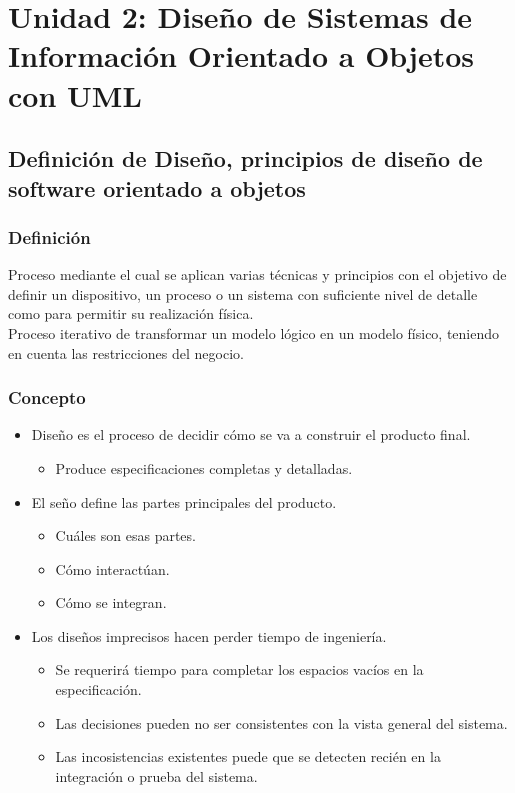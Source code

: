 \section{Unidad 2: Diseño de Sistemas de Información Orientado a Objetos con UML}
\subsection{Definición de Diseño, principios de diseño de software orientado a objetos}
\subsubsection{Definición}
Proceso mediante el cual se aplican varias técnicas y principios con el objetivo de definir un dispositivo, un proceso o un sistema con suficiente nivel de detalle como para permitir su realización física.\\ 
Proceso iterativo de transformar un modelo lógico en un modelo físico, teniendo en cuenta las restricciones del negocio.\\
\subsubsection{Concepto}
\begin{itemize}
\item Diseño es el proceso de decidir cómo se va a construir el producto final.
\begin{itemize}
\item Produce especificaciones completas y detalladas.
\end{itemize}
\item El seño define las partes principales del producto.
\begin{itemize}
\item Cuáles son esas partes.
\item Cómo interactúan.
\item Cómo se integran.
\end{itemize}
\item Los diseños imprecisos hacen perder tiempo de ingeniería.
\begin{itemize}
\item Se requerirá tiempo para completar los espacios vacíos en la especificación.
\item Las decisiones pueden no ser consistentes con la vista general del sistema.
\item Las incosistencias existentes puede que se detecten recién en la integración o prueba del sistema.
\end{itemize}
\end{itemize}
\clearpage
